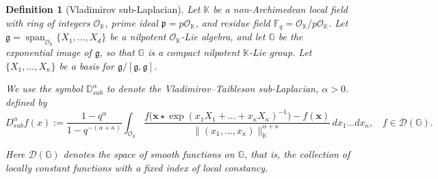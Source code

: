 \documentclass[12pt, reqno]{amsart}
\newtheorem{defi}{Definition}[section]
\newcommand{\D}{\mathbb{D}}
\newcommand{\1}{\mathds{1}}
\newcommand{\g}{\mathfrak{g}}
\begin{document}
\begin{defi}[Vladimirov sub-Laplacian]\label{defusublap}
Let $\mathbb{K}$ be a non-Archimedean local field with ring of integers $\mathcal{O}_{\mathbb{K}}$, prime ideal $\mathfrak{p} = p \mathcal{O}_{\mathbb{K}}$, and residue field $\mathbb{F}_q = \mathcal{O}_{\mathbb{K}} / p \mathcal{O}_{\mathbb{K}}$. Let $\mathfrak{g} = \operatorname{span}_{\mathcal{O}_{\mathbb{K}}}\{X_1,\dots,X_d\}$ be a nilpotent $\mathcal{O}_{\mathbb{K}}$-Lie algebra, and let $\mathbb{G}$ be the exponential image of $\mathfrak{g}$, so that $\mathbb{G}$ is a compact nilpotent $\mathbb{K}$-Lie group. Let $\{X_1,...,X_\kappa \}$ be a basis for $\g/[\g,\g]$.

We use the symbol $\D^{\alpha}_{sub}$ to denote the \emph{Vladimirov--Taibleson sub-Laplacian}, $\alpha>0$. defined by
\[
D_{sub}^{\alpha} f(x)
:=
\frac{1 - q^{\alpha}}{1 - q^{-(\alpha+\kappa)}}
\int_{\mathcal{O}_{\mathbb{K}}}
\frac{
f\big(\mathbf{x} \star \exp(x_1X_1 +...+x_\kappa X_\kappa)^{-1}\big) - f(\mathbf{x})
}{
\|(x_1,...,x_\kappa)\|_{\mathbb{K}}^{\alpha+\kappa}
}\, dx_1...dx_\kappa,
\, \,\;\; f \in \mathcal{D}(\mathbb{G}).
\]

Here $\mathcal{D}(\mathbb{G})$ denotes the space of smooth functions on $\mathbb{G}$, that is, the collection of locally constant functions with a fixed index of local constancy.
\end{defi}
\end{document}
